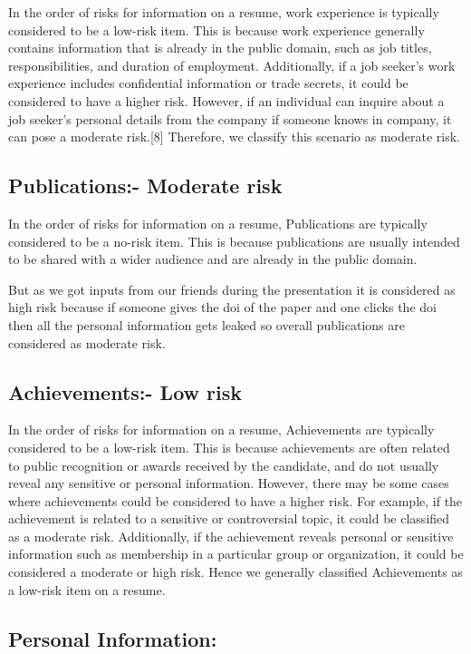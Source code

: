 \documentclass{article}
\begin{document}
In the order of risks for information on a resume, work experience is typically considered to be a low-risk item. This is because work experience generally contains information that is already in the public domain, such as job titles, responsibilities, and duration of employment. Additionally, if a job seeker's work experience includes confidential information or trade secrets, it could be considered to have a higher risk.
However, if an individual can inquire about a job seeker's personal details from the company if someone knows in company, it can pose a moderate risk.[8] Therefore, we classify this scenario as moderate risk.
\subsection{Publications:- Moderate risk}

In the order of risks for information on a resume, Publications are typically considered to be a no-risk item. This is because publications are usually intended to be shared with a wider audience and are already in the public domain.

But as we got inputs from our friends during the presentation it is considered as high risk because if someone gives the doi of the paper and one clicks the doi then all the personal information gets leaked so overall publications are considered as moderate risk.
\subsection{Achievements:- Low risk}

In the order of risks for information on a resume, Achievements are typically considered to be a low-risk item. This is because achievements are often related to public recognition or awards received by the candidate, and do not usually reveal any sensitive or personal information.
However, there may be some cases where achievements could be considered to have a higher risk. For example, if the achievement is related to a sensitive or controversial topic, it could be classified as a moderate risk. Additionally, if the achievement reveals personal or sensitive information such as membership in a particular group or organization, it could be considered a moderate or high risk.
Hence we generally classified Achievements as a low-risk item on a resume.

\subsection{Personal Information:}
\end{document}
